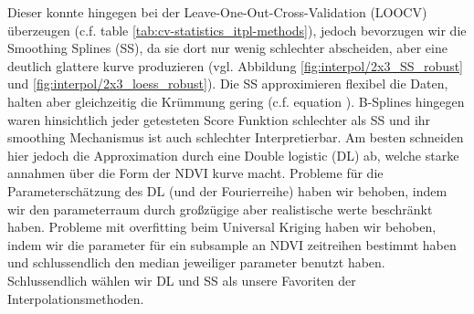     Dieser konnte hingegen bei der Leave-One-Out-Cross-Validation (LOOCV)  überzeugen (c.f. table  \ref{tab:cv-statistics_itpl-methods}), jedoch bevorzugen wir die Smoothing Splines (SS), da sie dort nur wenig schlechter abscheiden, aber eine deutlich glattere kurve produzieren (vgl. Abbildung \ref{fig:interpol/2x3_SS_robust} und \ref{fig:interpol/2x3_loess_robust}). Die SS approximieren flexibel die Daten, halten aber gleichzeitig die Krümmung gering (c.f. equation ). B-Splines hingegen waren hinsichtlich jeder getesteten Score Funktion schlechter als SS und ihr smoothing Mechanismus ist auch schlechter Interpretierbar. Am besten schneiden hier jedoch die Approximation durch eine Double logistic (DL) ab, welche starke annahmen über die Form der NDVI kurve macht. Probleme für die Parameterschätzung des DL (und der Fourierreihe) haben wir behoben, indem wir den parameterraum durch großzügige aber realistische werte beschränkt haben. Probleme mit overfitting beim Universal Kriging haben wir behoben, indem wir die parameter für ein subsample an NDVI zeitreihen bestimmt haben und schlussendlich den median jeweiliger parameter benutzt haben. 
    Schlussendlich wählen wir DL und SS als unsere Favoriten der Interpolationsmethoden.

